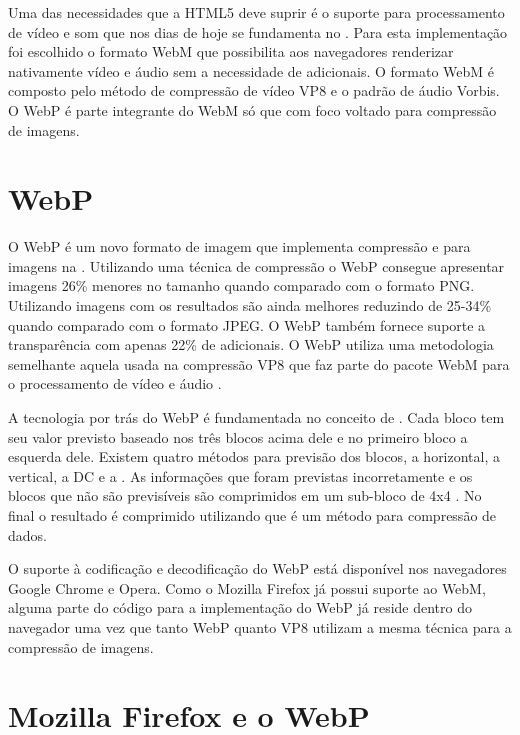 \documentclass[espaco=simples,appendix=Name]{abnt}
\begin{document}
\begin{description}
Uma das necessidades que a HTML5 deve suprir é o suporte para processamento de vídeo e som que nos dias de hoje se fundamenta no . Para esta implementação foi escolhido o formato WebM que possibilita aos navegadores renderizar nativamente vídeo e áudio sem a necessidade de  adicionais. O formato WebM é composto pelo método de compressão de vídeo VP8 e o padrão de áudio Vorbis. O WebP é parte integrante do WebM só que com foco voltado para compressão de imagens.

\section{WebP}

\item \noindent
O WebP é um novo formato de imagem que implementa compressão  e  para imagens na . Utilizando uma técnica de compressão  o WebP consegue apresentar imagens 26\% menores no tamanho quando comparado com o formato PNG. Utilizando imagens com  os resultados são ainda melhores reduzindo de 25-34\% quando comparado com o formato JPEG. O WebP também fornece suporte a transparência com apenas 22\% de  adicionais. O WebP utiliza uma metodologia semelhante aquela usada na compressão VP8 que faz parte do pacote WebM para o processamento de vídeo e áudio \cite{WebPLossyStudy}.

A tecnologia por trás do WebP é fundamentada no conceito de . Cada bloco tem seu valor previsto baseado nos três blocos acima dele e no primeiro bloco a esquerda dele. Existem quatro métodos para previsão dos blocos, a horizontal, a vertical, a DC e a . As informações que foram previstas incorretamente e os blocos que não são previsíveis são comprimidos em um sub-bloco de 4x4 . No final o resultado é comprimido utilizando  que é um método  para compressão de dados.

O suporte à codificação e decodificação do WebP está disponível nos navegadores Google Chrome e Opera. Como o Mozilla Firefox já possui suporte ao WebM, alguma parte do código para a implementação do WebP já reside dentro do navegador uma vez que tanto WebP quanto VP8 utilizam a mesma técnica para a compressão de imagens.

\section{Mozilla Firefox e o WebP}


\end{description}
\end{document}
